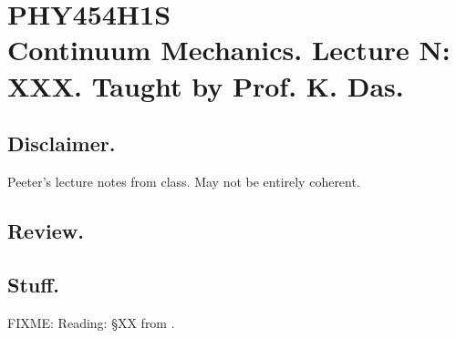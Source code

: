 
%

\chapter{PHY454H1S\\Continuum Mechanics.  Lecture {N}: XXX.  Taught by Prof. K. Das.}
\label{chap:continuumL{N}}
{}
\date{Feb XX, 2012}

\beginArtWithToc

\section{Disclaimer.}

Peeter's lecture notes from class.  May not be entirely coherent.

\section{Review.}

\section{Stuff.}

FIXME: Reading: \S XX from \cite{landau1960theory}.

\EndArticle

